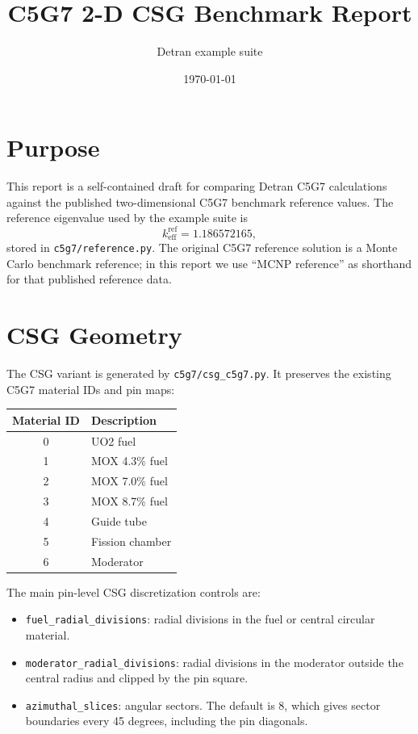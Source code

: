 \documentclass[11pt]{article}
\title{C5G7 2-D CSG Benchmark Report}
\author{Detran example suite}
\date{\today}
\newcommand{\code}[1]{\texttt{#1}}
\begin{document}
\maketitle

\section*{Purpose}

This report is a self-contained draft for comparing Detran C5G7 calculations
against the published two-dimensional C5G7 benchmark reference values.  The
reference eigenvalue used by the example suite is
\[
  k_{\mathrm{eff}}^{\mathrm{ref}} = 1.186572165 ,
\]
stored in \code{c5g7/reference.py}.  The original C5G7 reference solution is a
Monte Carlo benchmark reference; in this report we use ``MCNP reference'' as
shorthand for that published reference data.

\section*{CSG Geometry}

The CSG variant is generated by \code{c5g7/csg\_c5g7.py}.  It preserves the
existing C5G7 material IDs and pin maps:

\begin{center}
\begin{tabular}{cl}
\toprule
Material ID & Description \\
\midrule
0 & UO2 fuel \\
1 & MOX 4.3\% fuel \\
2 & MOX 7.0\% fuel \\
3 & MOX 8.7\% fuel \\
4 & Guide tube \\
5 & Fission chamber \\
6 & Moderator \\
\bottomrule
\end{tabular}
\end{center}

The main pin-level CSG discretization controls are:

\begin{itemize}
  \item \code{fuel\_radial\_divisions}: radial divisions in the fuel or central circular material.
  \item \code{moderator\_radial\_divisions}: radial divisions in the moderator outside the central radius and clipped by the pin square.
  \item \code{azimuthal\_slices}: angular sectors.  The default is 8, which gives sector boundaries every 45 degrees, including the pin diagonals.
\end{itemize}
\end{document}
